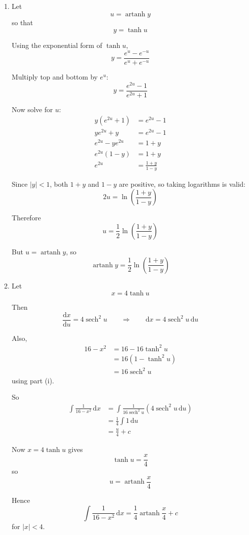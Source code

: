 \documentclass[leqno]{article}
\begin{document}
\begin{enumerate}[
  label=\textbf{\arabic*.},
  leftmargin=*,
  topsep=0pt,
  partopsep=0pt,
  parsep=0pt
]
\begin{tcolorbox}[colback=white, colframe=scarlet, title={\textbf{Solution}}, breakable, grow to left by=6mm, grow to right by=10mm]
\begin{enumerate}[label=\textbf{(\roman*)}]
Hence
\[
1-\tanh^2u=\operatorname{sech}^2u
\]

\item Let
\[
u=\operatorname{artanh}y
\]
so that
\[
y=\tanh u
\]

Using the exponential form of $\tanh u$,
\[
y=\frac{e^u-e^{-u}}{e^u+e^{-u}}
\]

Multiply top and bottom by $e^u$:
\[
y=\frac{e^{2u}-1}{e^{2u}+1}
\]

Now solve for $u$:
\[
\begin{aligned}
y(e^{2u}+1)&=e^{2u}-1 \\
ye^{2u}+y&=e^{2u}-1 \\
e^{2u}-ye^{2u}&=1+y \\
e^{2u}(1-y)&=1+y \\
e^{2u}&=\frac{1+y}{1-y}
\end{aligned}
\]

Since $|y|<1$, both $1+y$ and $1-y$ are positive, so taking logarithms is valid:
\[
2u=\ln\left(\frac{1+y}{1-y}\right)
\]

Therefore
\[
u=\frac12\ln\left(\frac{1+y}{1-y}\right)
\]

But $u=\operatorname{artanh}y$, so
\[
\operatorname{artanh}y=\frac12\ln\left(\frac{1+y}{1-y}\right)
\]

\item Let
\[
x=4\tanh u
\]

Then
\[
\frac{\mathrm{d}x}{\mathrm{d}u}=4\operatorname{sech}^2u
\qquad\Rightarrow\qquad
\mathrm{d}x=4\operatorname{sech}^2u\,\mathrm{d}u
\]

Also,
\[
\begin{aligned}
16-x^2
&=16-16\tanh^2u \\
&=16(1-\tanh^2u) \\
&=16\operatorname{sech}^2u
\end{aligned}
\]
using part (i).

So
\[
\begin{aligned}
\int \frac{1}{16-x^2}\,\mathrm{d}x
&=\int \frac{1}{16\operatorname{sech}^2u}\left(4\operatorname{sech}^2u\,\mathrm{d}u\right) \\
&=\frac14\int 1\,\mathrm{d}u \\
&=\frac{u}{4}+c
\end{aligned}
\]

Now $x=4\tanh u$ gives
\[
\tanh u=\frac{x}{4}
\]
so
\[
u=\operatorname{artanh}\frac{x}{4}
\]

Hence
\[
\int \frac{1}{16-x^2}\,\mathrm{d}x=\frac14\operatorname{artanh}\frac{x}{4}+c
\]
for $|x|<4$.


\end{enumerate}
\end{tcolorbox}
\end{enumerate}
\end{document}
